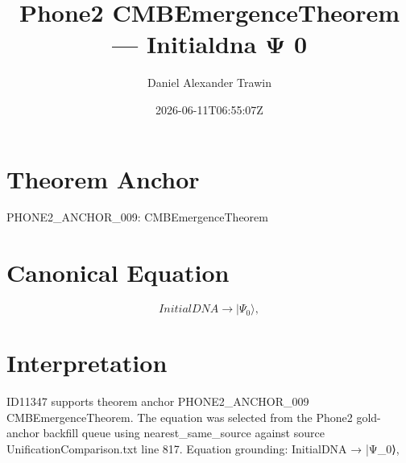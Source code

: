 \documentclass[11pt]{article}
\title{Phone2 CMBEmergenceTheorem — Initialdna Ψ 0}
\author{Daniel Alexander Trawin}
\date{2026-06-11T06:55:07Z}
\begin{document}
\maketitle
\section*{Theorem Anchor}
PHONE2_ANCHOR_009: CMBEmergenceTheorem
\section*{Canonical Equation}
\[
InitialDNA → |Ψ_0⟩,
\]
\section*{Interpretation}
ID11347 supports theorem anchor PHONE2_ANCHOR_009 CMBEmergenceTheorem. The equation was selected from the Phone2 gold-anchor backfill queue using nearest_same_source against source UnificationComparison.txt line 817. Equation grounding: InitialDNA → |Ψ_0⟩,
\end{document}
